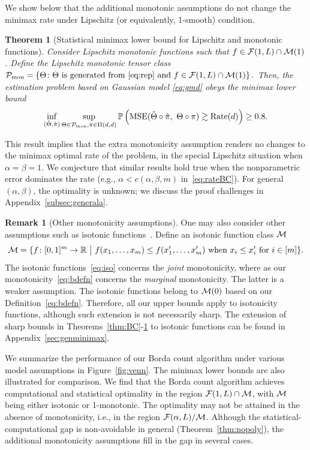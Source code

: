 \documentclass[12pt]{article}
\newtheorem{thm}{Theorem}
\theoremstyle{definition}
\newtheorem{rmk}{Remark}
\begin{document}
{ 
We show below that the additional monotonic assumptions do not change the minimax rate under Lipschitz (or equivalently, 1-smooth) condition. 
\begin{thm}[Statistical minimax lower bound for Lipschitz and monotonic functions]\label{thm:mminimax}
Consider Lipschitz monotonic functions such that  $f\in\mathcal{F}(1,L)\cap \mathcal{M}(1)$. Define the Lipschitz monotonic tensor class 
$
\mathcal{P}_{\textup{mon}} = \left\{\Theta\colon \Theta \text{ is generated from~\eqref{eq:rep}} \text{ and } f\in\mathcal{F}(1,L)\cap \mathcal{M}(1)\right\}.
$
Then, the estimation problem based on Gaussian model \eqref{eq:gmd} obeys the minimax lower bound
\begin{align}\label{eq:mconclusion}
    \inf_{(\hat\Theta,\hat\pi)}\sup_{\Theta\in\tP_{\textup{mon}},\pi\in\Pi(d,d)}\mathbb{P}\left(\textup{MSE}(\hat\Theta\circ\hat\pi,\ \Theta\circ\pi) \gtrsim \textup{Rate}(d) \right) \geq 0.8.
\end{align}
\end{thm}
This result implies that the extra monotonicity assumption renders no changes to the minimax optimal rate of the problem, in the special Lipschitz situation when $\alpha=\beta=1$. We conjecture that similar results hold true when the nonparametric error dominates the rate (e.g., $\alpha<c(\alpha,\beta,m)$ in~\eqref{eq:rateBC}). For general $(\alpha,\beta)$, the optimality is unknown; we discuss the proof challenges in Appendix~\ref{subsec:generala}.  



\begin{rmk}[Other monotonicity assumptions]\label{rmk:BC2}
One may also consider other assumptions such as isotonic functions~\citep{pananjady2022isotonic}. 
Define an isotonic function class $\mathcal{M}$ 
\begin{align}\label{eq:iso}
    \tM = \{f\colon[0,1]^m\rightarrow\mathbb{R}\ \big|\ f(x_1,\ldots,x_m)\leq f(x_1',\ldots,x_m')\text{ when } x_i\leq x_i' \text{ for } i\in[m]\}.
\end{align}
The isotonic functions~\eqref{eq:iso} concerns the \emph{joint} monotonicity, where as our monotonicity~\eqref{eq:bdefn} concerns the \emph{marginal} monotonicity. The latter is a weaker assumption. The isotonic functions belong to $\mathcal{M}(0)$ based on our Definition~\ref{eq:bdefn}. Therefore, all our upper bounds apply to isotonicity functions, although such extension is not necessarily sharp. The extension of sharp bounds in Theorems~\ref{thm:BC}-\ref{thm:mminimax} to isotonic functions can be found in Appendix~\ref{sec:genminimax}.
\end{rmk}


We summarize the performance of our Borda count algorithm under various model assumptions in Figure~\ref{fig:venn}. The minimax lower bounds are also illustrated for comparison. We find that the Borda count algorithm achieves computational and statistical optimality in the region $\mathcal{F}(1,L)\cap \mathcal{M}$, with $\mathcal{M}$ being either isotonic or 1-monotonic. The optimality may not be attained in the absence of monotonicity, i.e., in the region $\mathcal{F}(\alpha,L)/\mathcal{M}$. Although the statistical-computational gap is non-avoidable in general (Theorem~\ref{thm:nopoly}), the additional monotonicity assumptions fill in the gap in several cases.}
\end{document}
